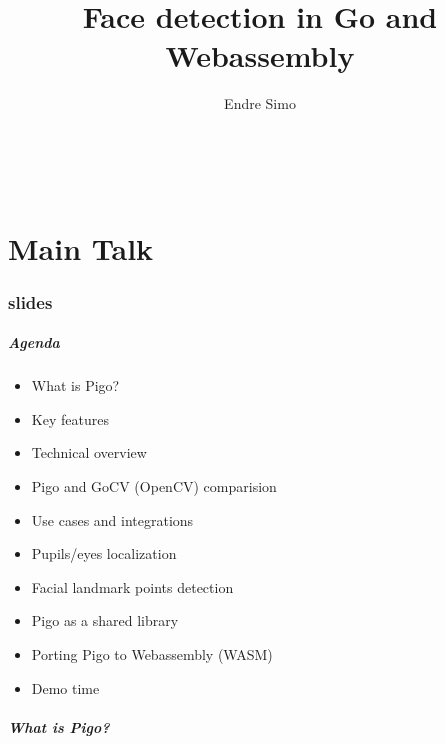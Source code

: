 \documentclass[9pt]{beamer}
\title[Face detection in Go and Webassembly]{Face detection in Go and Webassembly}
\author[Endre Simo]{
 \parbox{0.26\textwidth}{
	\texorpdfstring
	  {
		\centering
 		Endre Simo \\
 		\myblue{\href{https://esimov.com}{\texttt{https://esimov.com}}} \\
 		\myblue{\href{https://github.com/esimov}{\texttt{https://github.com/esimov}}} \\
 		\myblue{\href{https://twitter/simo_endre}{\texttt{https://twitter/simo\_endre}}} \\
 	  }
	{Endre Simo}
}
 }
\begin{document}
\frame{\titlepage
}

\part<presentation>{Main Talk}

\section[slides]{slides}

\begin{frame}[fragile]
\frametitle{Agenda}


\begin{itemize}
\item What is Pigo?
\item Key features
\item Technical overview
\item Pigo and GoCV (OpenCV) comparision
\item Use cases and integrations
\item Pupils/eyes localization
\item Facial landmark points detection
\item Pigo as a shared library
\item Porting Pigo to Webassembly (WASM)
\item Demo time
\end{itemize}


\end{frame}

\begin{frame}[fragile]
\frametitle{What is Pigo?}


\end{frame}
\end{document}
